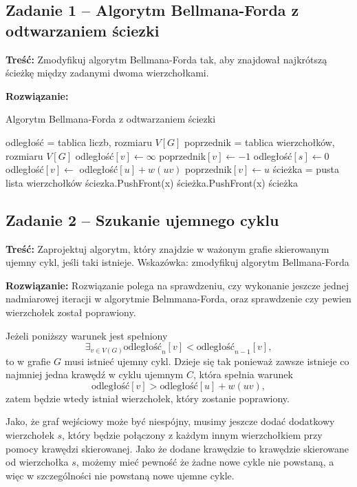 \subsection{Zadanie 1 -- Algorytm Bellmana-Forda z odtwarzaniem ściezki}
\textbf{Treść: }Zmodyfikuj algorytm Bellmana-Forda tak, 
aby znajdował najkrótszą ścieżkę między zadanymi dwoma
wierzchołkami.

\textbf{Rozwiązanie: }

\begin{algorithm}[H]
	\caption{Algorytm Bellmana-Forda z odtwarzaniem ściezki}
	\begin{algorithmic}[1]
		\State odległość = tablica liczb, rozmiaru $V[G]$
		\State poprzednik = tablica wierzchołków, rozmiaru $V[G]$
		\State odległość$[v]\gets\infty$
		\State poprzednik$[v]\gets-1$
		\EndFor
		\State odległość$[s]\gets0$
		\State odległość$[v]\gets$ odległość$[u] + w(uv)$ 
		\State poprzednik$[v]\gets u$
		\EndIf
		\EndFor
		\EndFor
		\State ścieżka = pusta lista wierzchołków
		\State ściezka.PushFront(x)
		\State ścieżka.PushFront(x)
		\EndWhile
		\State \Return ścieżka
		\EndProcedure
	\end{algorithmic}
	\label{Zadanie31}
\end{algorithm}
\subsection{Zadanie 2 -- Szukanie ujemnego cyklu}
\textbf{Treść: } Zaprojektuj algorytm, który znajdzie w 
ważonym grafie skierowanym ujemny cykl, jeśli taki istnieje.
Wskazówka: zmodyfikuj algorytm Bellmana-Forda

\textbf{Rozwiązanie: }
Rozwiązanie polega na sprawdzeniu, czy wykonanie
jeszcze jednej nadmiarowej iteracji 
w algorytmie Belmmana-Forda, oraz sprawdzenie
czy pewien wierzchołek został poprawiony.

Jeżeli poniższy warunek jest spełniony
\[\exists_{v\in V(G)} \text{odległość}_n[v] < \text{odległość}_{n-1}[v],\]
to w grafie $G$ musi istnieć ujemny cykl. Dzieje się 
tak ponieważ zawsze istnieje co najmniej jedna krawędź 
w cyklu ujemnym $C$, która spełnia warunek 
\[\text{odległość}[v] > \text{odległość}[u] + w(uv),\]
zatem będzie wtedy istniał wierzchołek, który zostanie 
poprawiony.

Jako, że graf wejściowy może być niespójny,
musimy jeszcze dodać dodatkowy wierzchołek $s$, który
będzie połączony z każdym innym wierzchołkiem
przy pomocy krawędzi skierowanej. Jako
że dodane krawędzie to krawędzie skierowane
od wierzchołka $s$, możemy mieć pewność
że żadne nowe cykle nie powstaną, a więc
w szczególności nie powstaną nowe
ujemne cykle.

